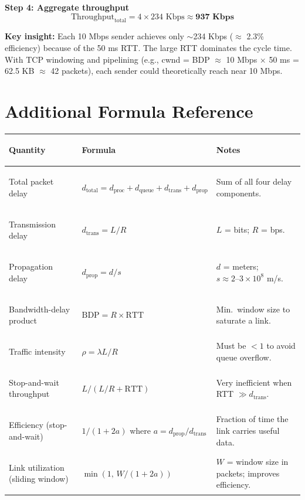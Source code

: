 \documentclass[11pt, letterpaper]{article}
\begin{document}
\textbf{Step 4: Aggregate throughput}
\[
  \text{Throughput}_{\text{total}} = 4 \times 234 \text{ Kbps} \approx \textbf{937 Kbps}
\]

\begin{tcolorbox}[colback=part5bg, colframe=sectionteal, arc=3pt, boxrule=1pt]
\textbf{Key insight:} Each 10 Mbps sender achieves only $\sim$234 Kbps ($\approx$ 2.3\% efficiency) because of the 50 ms RTT. The large RTT dominates the cycle time. With TCP windowing and pipelining (e.g., cwnd = BDP $\approx$ 10 Mbps $\times$ 50 ms = 62.5 KB $\approx$ 42 packets), each sender could theoretically reach near 10 Mbps.
\end{tcolorbox}

\section*{Additional Formula Reference}

\noindent
{\renewcommand{\arraystretch}{1.7}
\begin{tabularx}{\textwidth}{>{\bfseries\raggedright\arraybackslash}p{4.5cm}
                              >{\centering\arraybackslash}p{4.2cm}
                              >{\raggedright\arraybackslash}X}
\toprule
\rowcolor{tableheaderteal}
\textbf{Quantity} & \textbf{Formula} & \textbf{Notes} \\
\midrule
\rowcolor{rowTe} Total packet delay       & $d_{\text{total}} = d_{\text{proc}} + d_{\text{queue}} + d_{\text{trans}} + d_{\text{prop}}$ & Sum of all four delay components. \\
\rowcolor{rowA}  Transmission delay       & $d_{\text{trans}} = L / R$ & $L$ = bits; $R$ = bps. \\
\rowcolor{rowTe} Propagation delay        & $d_{\text{prop}} = d / s$ & $d$ = meters; $s \approx 2\text{--}3 \times 10^8$ m/s. \\
\rowcolor{rowA}  Bandwidth-delay product  & $\text{BDP} = R \times \text{RTT}$ & Min.\ window size to saturate a link. \\
\rowcolor{rowTe} Traffic intensity        & $\rho = \lambda L / R$ & Must be $< 1$ to avoid queue overflow. \\
\rowcolor{rowA}  Stop-and-wait throughput & $L / (L/R + \text{RTT})$ & Very inefficient when RTT $\gg d_{\text{trans}}$. \\
\rowcolor{rowTe} Efficiency (stop-and-wait) & $1 / (1 + 2a)$ where $a = d_{\text{prop}} / d_{\text{trans}}$ & Fraction of time the link carries useful data. \\
\rowcolor{rowA}  Link utilization (sliding window) & $\min(1,\, W / (1 + 2a))$ & $W$ = window size in packets; improves efficiency. \\
\bottomrule
\end{tabularx}}
\end{document}
